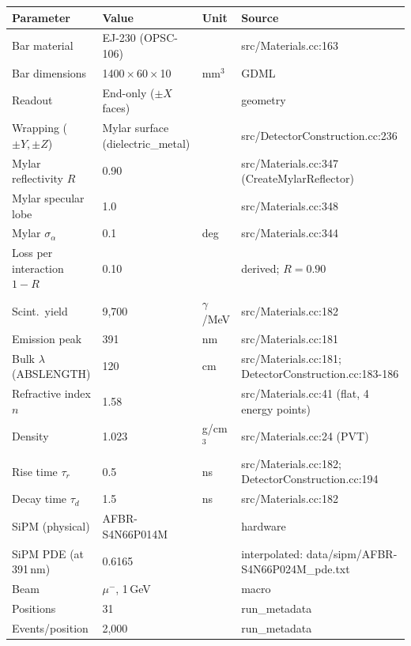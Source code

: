\begin{tabular}{llll}\toprule
Parameter & Value & Unit & Source \\
\midrule
Bar material & EJ-230 (OPSC-106) &  & src/Materials.cc:163 \\
Bar dimensions & 1400\,$\times$\,60\,$\times$\,10 & mm$^3$ & GDML \\
Readout & End-only ($\pm X$ faces) &  & geometry \\
Wrapping ($\pm Y,\pm Z$) & Mylar surface (dielectric\_metal) &  & src/DetectorConstruction.cc:236 \\
Mylar reflectivity $R$ & 0.90 &  & src/Materials.cc:347 (CreateMylarReflector) \\
Mylar specular lobe & 1.0 &  & src/Materials.cc:348 \\
Mylar $\sigma_\alpha$ & 0.1 & deg & src/Materials.cc:344 \\
Loss per interaction $1-R$ & 0.10 &  & derived; $R=0.90$ \\
Scint.~yield & 9,700 & $\gamma$/MeV & src/Materials.cc:182 \\
Emission peak & 391 & nm & src/Materials.cc:181 \\
Bulk $\lambda$ (ABSLENGTH) & 120 & cm & src/Materials.cc:181; DetectorConstruction.cc:183-186 \\
Refractive index $n$ & 1.58 &  & src/Materials.cc:41 (flat, 4 energy points) \\
Density & 1.023 & g/cm$^3$ & src/Materials.cc:24 (PVT) \\
Rise time $\tau_r$ & 0.5 & ns & src/Materials.cc:182; DetectorConstruction.cc:194 \\
Decay time $\tau_d$ & 1.5 & ns & src/Materials.cc:182 \\
SiPM (physical) & AFBR-S4N66P014M &  & hardware \\
SiPM PDE (at 391\,nm) & 0.6165 &  & interpolated: data/sipm/AFBR-S4N66P024M\_pde.txt \\
Beam & $\mu^-$, 1\,GeV &  & macro \\
Positions & 31 &  & run\_metadata \\
Events/position & 2,000 &  & run\_metadata \\
\bottomrule\end{tabular}

